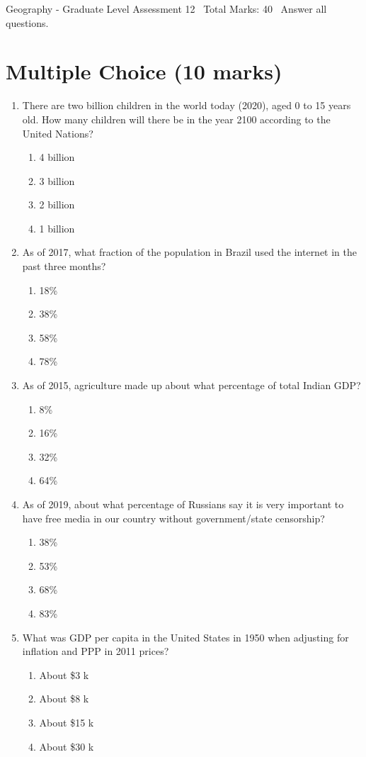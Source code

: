 \documentclass[12pt]{article}
\begin{document}
\begin{center}
Geography - Graduate Level Assessment 12 \
Total Marks: 40 \
Answer all questions.
\end{center}

\section*{Multiple Choice (10 marks)}
\begin{enumerate}[label=\arabic*.]
\item There are two billion children in the world today (2020), aged 0 to 15 years old. How many children will there be in the year 2100 according to the United Nations?
\begin{enumerate}[label=(\alph*)]
    \item 4 billion
    \item 3 billion
    \item 2 billion
    \item 1 billion
\end{enumerate}
\item As of 2017, what fraction of the population in Brazil used the internet in the past three months?
\begin{enumerate}[label=(\alph*)]
    \item 18\%
    \item 38\%
    \item 58\%
    \item 78\%
\end{enumerate}
\item As of 2015, agriculture made up about what percentage of total Indian GDP?
\begin{enumerate}[label=(\alph*)]
    \item 8\%
    \item 16\%
    \item 32\%
    \item 64\%
\end{enumerate}
\item As of 2019, about what percentage of Russians say it is very important to have free media in our country without government/state censorship?
\begin{enumerate}[label=(\alph*)]
    \item 38\%
    \item 53\%
    \item 68\%
    \item 83\%
\end{enumerate}
\item What was GDP per capita in the United States in 1950 when adjusting for inflation and PPP in 2011 prices?
\begin{enumerate}[label=(\alph*)]
    \item About \$3 k
    \item About \$8 k
    \item About \$15 k
    \item About \$30 k
\end{enumerate}
\end{enumerate}
\end{document}

